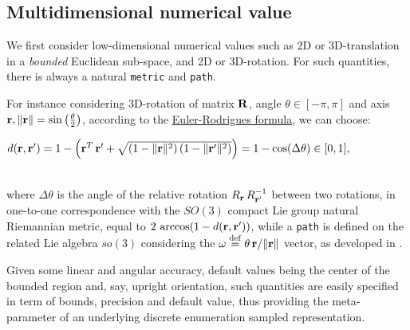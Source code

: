 \documentclass[a4,12pt]{article}
\newcommand{\deq}{\stackrel {\rm def}{=}}
\newcommand{\eqline}[1]{\\\centerline{$#1$}\\}
\begin{document}
\iffalse
We must introduce another ingredient in order to define the barycenter, e.g., a {\em kernel} $\rho_i()$, so that:
\eqline{x_i(q') = \rho_i\left(\frac{q' - q_{min}}{q_{min} - q_{max}}\right), \mbox{ with still } q' = \sum_i x_i(q') \, q_i(i),}
these kernels defining a \href{https://en.wikipedia.org/wiki/Partition_of_unity}{partition of unity}, with:
\eqline{\begin{array}{l} \rho_i(u) = \mbox{argmax}_\rho \sum_i \rho(u) \, \log_2(\rho(u)), \;\;\; \rho_i(u) \geq 0, \;\;\; \sum_i \rho_i(u) = 1, \\ u \notin [0, 1] \Rightarrow \rho_i(u) = 0, \;\;\; u_i(i) = \mbox{argmax}_u \rho_i(u) \end{array}}
with $u_i \deq \frac{q_i - q_{min}}{q_{min} - q_{max}} \in [0, 1]$, in words a maximal entropy, bounded distribution, maximal on each vertex.
\fi

\subsection*{Multidimensional numerical value} 

We first consider low-dimensional numerical values such as 2D or 3D-translation in a {\em bounded} Euclidean sub-space, and 2D or 3D-rotation. For such quantities, there is always a natural {\tt metric} and {\tt path}. 

For instance considering 3D-rotation of matrix ${\bf R}$, angle $\theta \in [-\pi, \pi]$ and axis ${\bf r}, \|{\bf r}\| = \sin\left(\frac{\theta}{2}\right)$, according to the \href{https://en.wikipedia.org/wiki/Euler-Rodrigues\_formula}{Euler-Rodrigues formula}, we can choose:
\eqline{d({\bf r}, {\bf r}') = 1 - \left({\bf r}^T \, {\bf r}' + \sqrt{(1-\|{\bf r}\|^2)\,(1-\|{\bf r}'\|^2)}\right) = 1 - \cos(\Delta\theta) \in [0, 1],}
where $\Delta\theta$ is the angle of the relative rotation $R_{\bf r} \, R_{{\bf r}'}^{-1}$ between two rotations, in one-to-one correspondence with the $SO(3)$ compact Lie group natural Riemannian metric, equal to $2\,\arccos(1 - d({\bf r}, {\bf r}'))$, while a {\tt path} is defined on the related Lie algebra $so(3)$ considering the $\omega \deq \theta \, {\bf r} / \|{\bf r}\|$ vector, as developed in \cite{huynh2009metrics}.

Given some linear and angular accuracy, default values being the center of the bounded region and, say, upright orientation, such quantities are easily specified in term of bounds, precision and default value, thus providing the meta-parameter of an underlying discrete enumeration sampled representation.
\end{document}
